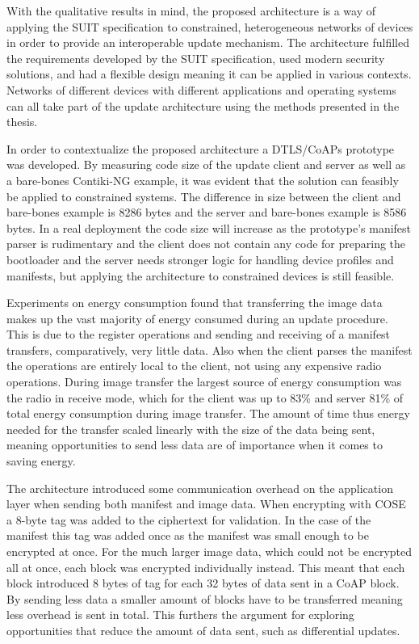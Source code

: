 \documentclass[0-thesis.tex]{subfiles}
\begin{document}
With the qualitative results in mind, the proposed architecture is a way of applying the
SUIT specification to constrained, heterogeneous networks of devices in order to provide
an interoperable update mechanism. The architecture fulfilled the requirements developed
by the SUIT specification, used modern security solutions, and had a flexible design
meaning it can be applied in various contexts. Networks of different devices with
different applications and operating systems can all take part of the update architecture
using the methods presented in the thesis.

In order to contextualize the proposed architecture a DTLS/CoAPs prototype was developed.
By measuring code size of the update client and server as well as a bare-bones Contiki-NG
example, it was evident that the solution can feasibly be applied to constrained systems.
The difference in size between the client and bare-bones example is 8286 bytes and the
server and bare-bones example is 8586 bytes. In a real deployment the code size will
increase as the prototype's manifest parser is rudimentary and the client does not contain
any code for preparing the bootloader and the server needs stronger logic for handling
device profiles and manifests, but applying the architecture to constrained devices is
still feasible.

Experiments on energy consumption found that transferring the image data makes up the vast
majority of energy consumed during an update procedure. This is due to the register
operations and sending and receiving of a manifest transfers, comparatively, very little
data. Also when the client parses the manifest the operations are entirely local to the
client, not using any expensive radio operations. During image transfer the largest source
of energy consumption was the radio in receive mode, which for the client was up to 83\%
and server 81\% of total energy consumption during image transfer. The amount of time thus
energy needed for the transfer scaled linearly with the size of the data being sent,
meaning opportunities to send less data are of importance when it comes to saving energy.

The architecture introduced some communication overhead on the application layer when
sending both manifest and image data. When encrypting with COSE a 8-byte tag was added to
the ciphertext for validation. In the case of the manifest this tag was added once as the
manifest was small enough to be encrypted at once. For the much larger image data, which
could not be encrypted all at once, each block was encrypted individually instead. This
meant that each block introduced 8 bytes of tag for each 32 bytes of data sent in a CoAP
block. By sending less data a smaller amount of blocks have to be transferred meaning less
overhead is sent in total. This furthers the argument for exploring opportunities that
reduce the amount of data sent, such as differential updates.
\end{document}
